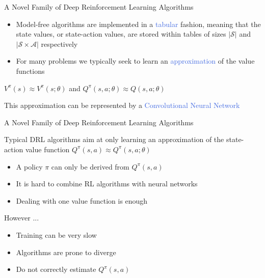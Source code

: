 \documentclass{beamer}
\begin{document}
\begin{frame}{A Novel Family of Deep Reinforcement Learning Algorithms}
	\begin{itemize}
		\item Model-free algorithms are implemented in a \textcolor{RoyalBlue}{tabular} fashion, meaning that the state values, or state-action values, are stored within tables of sizes $|\mathcal{S}|$ and $|\mathcal{S}\times\mathcal{A}|$ respectively

		\item For many problems we typically seek to learn an \textcolor{RoyalBlue}{approximation} of the value functions
	\end{itemize}
	
	\begin{center}

		$V^{\pi}(s)\approx V^\pi{(s;\theta)}$ and $Q^{\pi}(s,a;\theta)\approx Q(s,a;\theta)$
	\end{center}
	
	\bigskip

	This approximation can be represented by a \textcolor{RoyalBlue}{Convolutional Neural Network}

\end{frame}

\begin{frame}{A Novel Family of Deep Reinforcement Learning Algorithms}

	Typical DRL algorithms aim at only learning an approximation of the state-action value function $Q^{\pi}(s,a)\approx Q^{\pi}(s,a;\theta)$

	\begin{itemize}
		\item A policy $\pi$ can only be derived from $Q^{\pi}(s,a)$ 
		\item It is hard to combine RL algorithms with neural networks
		\item Dealing with one value function is enough
	\end{itemize}

	\bigskip

	However ...

	\begin{itemize}
		\item Training can be very slow 
		\item Algorithms are prone to diverge
		\item Do not correctly estimate $Q^{\pi}(s,a)$
	\end{itemize}

\end{frame}
\end{document}
